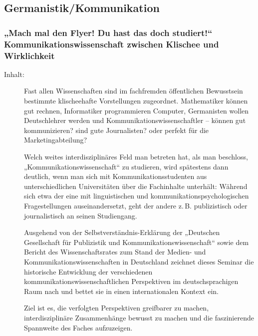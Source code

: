 \documentclass[%
a4paper, %
11pt,               %
leqno,              %
fleqn,              %
]
{scrartcl}
\begin{document}


\subsection{Germanistik/Kommunikation} %
\label{sub:Germanistik/Kommunikation}

\subsubsection{„Mach mal den Flyer! Du hast das doch studiert!“
Kommunikationswissenschaft zwischen Klischee und Wirklichkeit} %
\label{ssub:„Mach mal den Flyer! Du hast das doch studiert!“
Kommunikationswissenschaft zwischen Klischee und Wirklichkeit}

\begin{description}
  \item[Inhalt:] Fast allen Wissenschaften sind im fachfremden öffentlichen
    Bewusstsein bestimmte klischeehafte Vorstellungen zugeordnet. Mathematiker
    können gut rechnen, Informatiker programmieren Computer, Germanisten wollen
    Deutschlehrer werden und Kommunikationswissenschaftler -- können gut
    kommunizieren? sind gute Journalisten? oder perfekt für die
    Marketingabteilung?

    Welch weites interdisziplinäres Feld man betreten hat, als man beschloss,
    „Kommunikationswissenschaft“ zu studieren, wird spätestens dann deutlich,
    wenn man sich mit Kommunikationsstudenten aus unterschiedlichen
    Universitäten über die Fachinhalte unterhält: Während sich etwa der eine mit
    linguistischen und kommunikationspsychologischen Fragestellungen
    auseinandersetzt, geht der andere z.\,B. publizistisch oder journalistisch
    an seinen Studiengang.

    Ausgehend von der Selbstverständnis-Erklärung der „Deutschen Gesellschaft
    für Publizistik und Kommunikationswissenschaft“ sowie dem Bericht des
    Wissenschaftsrates zum Stand der Medien- und Kommunikationswissenschaften in
    Deutschland zeichnet dieses Seminar die historische Entwicklung der
    verschiedenen kommunikationswissenschaftlichen Perspektiven im
    deutschsprachigen Raum nach und bettet sie in einen internationalen Kontext
    ein.

    Ziel ist es, die verfolgten Perspektiven greifbarer zu machen,
    interdisziplinäre Zusammenhänge bewusst zu machen und die faszinierende
    Spannweite des Faches aufzuzeigen.
\end{description}
\end{document}
